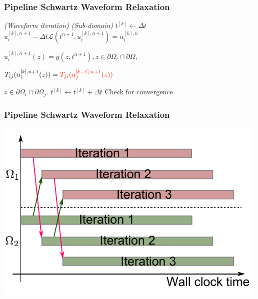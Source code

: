 \documentclass{beamer}
\begin{document}
\begin{frame}
  \frametitle{Pipeline Schwartz Waveform Relaxation}

    \begin{algorithmic}
    \textit{ (Waveform iteration)}
       \textit{ (Sub-domain)}
        \State $t^{[k]} \gets \Delta t$
            \State $u_i^{[k],n+1} - \Delta t\mathcal{L}(t^{n+1},u_i^{[k],n+1}) = u_i^{[k],n}$

            \State $u_i^{[k],n+1}(z) = g(z,t^{n+1}), 
                z \in \partial\Omega_i\cap\partial\Omega,$

            \State ${T}_{ij}(u_i^{[k],n+1}(z)) = 
                {\color{red}{T}_{ji}(u_j^{[k-1],n+1}(z))}$

            \State  $z \in \partial\Omega_i\cap\partial\Omega_j.$
            \State  $t^{[k]} \gets t^{[k]}+\Delta t$
          \EndIf
        \EndWhile
      \State Check for convergence          
      \EndParFor
    \EndFor
  \end{algorithmic}

\end{frame}


\begin{frame}
  \frametitle{Pipeline Schwartz Waveform Relaxation}
  \centering
  \includegraphics[height=0.7\textheight]{figures/pswr}
\end{frame}
\end{document}
